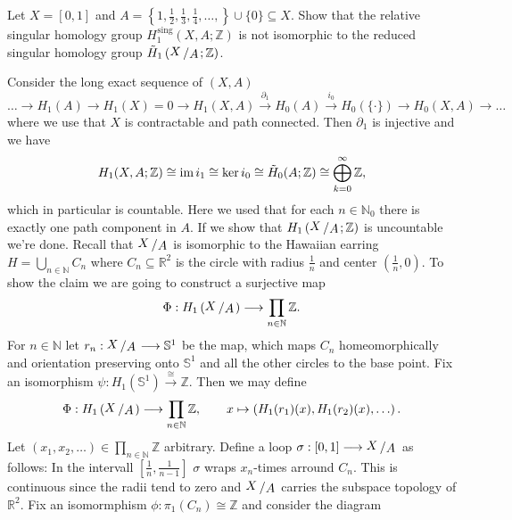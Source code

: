 \documentclass[11pt]{book}
\numberwithin{dummy}{section}
\theoremstyle{nonumberbreak}
\newenvironment{sol}[1][]{\ifthenelse{\equal{#1}{}}{\solution}{\solution[#1]}\rm}{\endsolution}
\newenvironment{prob}[1][]{\ifthenelse{\equal{#1}{}}{\problem}{\problem[#1]}\rm}{\endproblem}
\newcommand{\im}{\mathrm{im} \hspace{1.5pt}}
\newcommand{\Sph}{\mathbb{S}}
\newcommand{\la}{\longrightarrow}
\newcommand{\Z}{\mathbb{Z}}
\newcommand{\Hs}{H^{\hspace{1pt}\mathrm{sing}}}
\newcommand{\slant}[2]{{\raisebox{.1em}{$#1$}\left/\raisebox{-.1em}{$#2$}\right.}}
\begin{document}
\begin{spacing}{1.4}
\begin{prob}
\begin{sol}
\end{sol}

\end{prob}



\begin{prob}   %
Let $X=[0,1]$ and $A=\left\{1, \frac{1}{2}, \frac{1}{3}, \frac{1}{4},\ldots, \right\} \cup \{0\} \subseteq X$. Show that the relative singular homology group $\Hs_1(X,A;\Z)$ is not isomorphic to the reduced singular homology group $\tilde{H}_1\left(\slant{X}{A};\Z\right)$.

\begin{sol}
Consider the long exact sequence of $(X,A)$
$$\ldots \la H_1(A) \la H_1(X) = 0 \la H_1(X,A) \overset{\partial_1}{\la} H_0(A) \overset{i_0}{\la} H_0(\{\cdot\})  \la H_0(X,A) \la \ldots$$
where we use that $X$ is contractable and path connected. Then $\partial_1$ is injective and we have 
$$H_1(X,A;\Z) \cong \im i_1 \cong \ker i_0  \cong \tilde{H}_0(A;\Z) \cong \bigoplus_{k=0}^{\infty} \Z,$$
which in particular is countable. Here we used that for each $n \in \mathbb{N}_0$ there is exactly one path component in $A$. If we show that $H_1\left(\slant{X}{A};\Z\right)$ is uncountable we're done. Recall that $\slant{X}{A}$ is isomorphic to the Hawaiian earring $H= \bigcup_{n \in \mathbb{N}} C_n$ where $C_n \subseteq \mathbb{R}^2$ is the circle with radius $\frac{1}{n}$ and center $\left( \frac{1}{n},0\right)$. 
To show the claim we are going to construct a surjective map
$$\Phi: H_1\left( \slant{X}{A}\right) \la \prod_{n \in \mathbb{N}} \Z.$$
For $n \in \mathbb{N}$ let $r_n: \slant{X}{A} \la \Sph^1$ be the map, which maps $C_n$ homeomorphically and orientation preserving onto $\Sph^1$ and all the other circles to the base point. Fix an isomorphism $\psi: H_1(\Sph^1) \overset{\cong}{\la} \Z$. Then we may define
$$\Phi: H_1\left(\slant{X}{A}\right) \la \prod_{n \in \mathbb{N}} \Z, \qquad x \mapsto \left( H_1(r_1)(x), H_1(r_2)(x), \ldots \right).$$
Let $(x_1, x_2, \ldots) \in \prod_{n \in \mathbb{N}} \Z$ arbitrary. Define a loop $\sigma:[0,1] \la \slant{X}{A}$ as follows: In the intervall $\left[\frac{1}{n}, \frac{1}{n-1}\right]$ $\sigma$ wraps $x_n$-times arround $C_n$. This is continuous since the radii tend to zero and $\slant{X}{A}$ carries the subspace topology of $\mathbb{R}^2$. Fix an isomormphism $\phi: \pi_1(C_n) \cong \Z$ and consider the diagram


\end{sol}
\end{prob}
\end{spacing}
\end{document}
